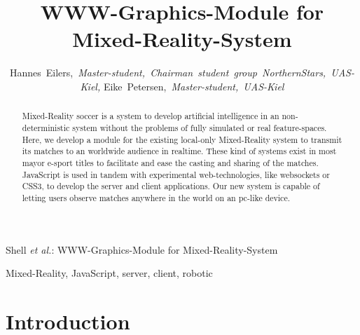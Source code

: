 \documentclass[journal]{IEEEtran}
\begin{document}
\title{WWW-Graphics-Module for Mixed-Reality-System}

\author{Hannes~Eilers,~\textit{Master-student,~Chairman~student~group~NorthernStars,~UAS-Kiel,}
Eike~Petersen,~\textit{Master-student,~UAS-Kiel}}

%
{Shell \MakeLowercase{\textit{et al.}}: WWW-Graphics-Module for Mixed-Reality-System}

\maketitle

\begin{abstract}
Mixed-Reality soccer is a system to develop artificial intelligence in an non-deterministic system without the problems of fully simulated or real feature-spaces. Here, we develop a module for the existing local-only Mixed-Reality system to transmit its matches to an worldwide audience in realtime. These kind of systems exist in most mayor e-sport titles\cite{counter-strike,starcraft2,dota2,waaaghtv} to facilitate and ease the casting and sharing of the matches. JavaScript is used in tandem with experimental web-technologies, like websockets or CSS3, to develop the server and client applications. Our new system is capable of letting users observe matches anywhere in the world on an pc-like device.
\end{abstract}
\begin{IEEEkeywords}
Mixed-Reality, JavaScript, server, client, robotic
\end{IEEEkeywords}

\section{Introduction}
\end{document}
